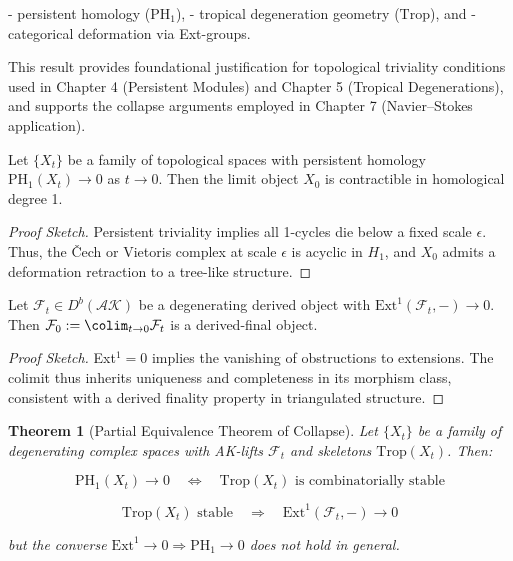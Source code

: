 \documentclass[11pt]{article}
\newtheorem{theorem}{Theorem}[section]
\begin{document}
- persistent homology ($\mathrm{PH}_1$),
- tropical degeneration geometry ($\mathrm{Trop}$), and
- categorical deformation via Ext-groups.

This result provides foundational justification for topological triviality conditions  
used in Chapter 4 (Persistent Modules) and Chapter 5 (Tropical Degenerations),  
and supports the collapse arguments employed in Chapter 7 (Navier–Stokes application).

\begin{lemma}
Let $\{X_t\}$ be a family of topological spaces with persistent homology $\mathrm{PH}_1(X_t) \to 0$ as $t \to 0$.  
Then the limit object $X_0$ is contractible in homological degree 1.
\end{lemma}

\begin{proof}[Proof Sketch]
Persistent triviality implies all 1-cycles die below a fixed scale $\epsilon$.  
Thus, the \v{C}ech or Vietoris complex at scale $\epsilon$ is acyclic in $H_1$, and $X_0$ admits a deformation retraction to a tree-like structure.
\end{proof}

\begin{lemma}
Let $\mathcal{F}_t \in D^b(\mathcal{AK})$ be a degenerating derived object with $\mathrm{Ext}^1(\mathcal{F}_t, -) \to 0$.  
Then $\mathcal{F}_0 := \colim_{t \to 0} \mathcal{F}_t$ is a derived-final object.
\end{lemma}

\begin{proof}[Proof Sketch]
Ext$^1 = 0$ implies the vanishing of obstructions to extensions.  
The colimit thus inherits uniqueness and completeness in its morphism class, consistent with a derived finality property in triangulated structure.
\end{proof}

\begin{theorem}[Partial Equivalence Theorem of Collapse]
Let $\{X_t\}$ be a family of degenerating complex spaces with AK-lifts $\mathcal{F}_t$ and skeletons $\mathrm{Trop}(X_t)$. Then:

\[
\mathrm{PH}_1(X_t) \to 0 \quad \Leftrightarrow \quad \mathrm{Trop}(X_t) \text{ is combinatorially stable}
\]

\[
\mathrm{Trop}(X_t) \text{ stable} \quad \Rightarrow \quad \mathrm{Ext}^1(\mathcal{F}_t, -) \to 0
\]

but the converse $\mathrm{Ext}^1 \to 0 \Rightarrow \mathrm{PH}_1 \to 0$ does not hold in general.

\end{theorem}
\end{document}
